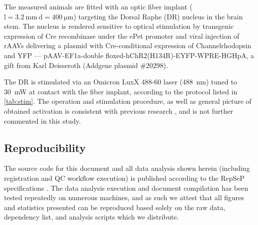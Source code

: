 The measured animals are fitted with an optic fiber implant ($\mathrm{l=\SI{3.2}{\milli\meter} \ d=\SI{400}{\micro\meter}}$) targeting the Dorsal Raphe (DR) nucleus in the brain stem.
The nucleus is rendered sensitive to optical stimulation by transgenic expression of Cre recombinase under the ePet promoter \cite{Scott2005} and viral injection of rAAVs delivering a plasmid with Cre-conditional expression of Channelrhodopsin and YFP ---
pAAV-EF1a-double floxed-hChR2(H134R)-EYFP-WPRE-HGHpA, a gift from Karl Deisseroth (Addgene plasmid \#20298).

The DR is stimulated via an Omicron LuxX 488-60 laser (\SI{488}{\nano\meter}) tuned to \SI{30}{\milli\watt} at contact with the fiber implant, according to the protocol listed in \cref{tab:stim}.
The operation and stimulation procedure, as well as general picture of obtained activation is consistent with previous research \cite{Grandjean2019}, and is not further commented in this study.

\subsection{Reproducibility}

The source code for this document and all data analysis shown herein (including registration and QC workflow execution) is published according to the RepSeP specifications \cite{repsep}.
The data analysis execution and document compilation has been tested repeatedly on numerous machines, and as such we attest that all figures and statistics presented can be reproduced based solely on the raw data, dependency list, and analysis scripts which we distribute.
